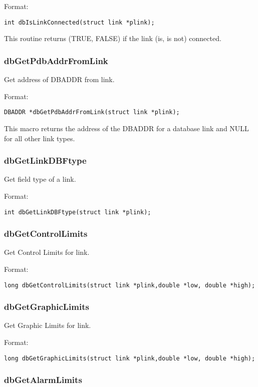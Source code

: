Format:

\begin{verbatim}int dbIsLinkConnected(struct link *plink);
\end{verbatim}This routine returns (TRUE, FALSE) if the link (is, is not) connected.

\subsubsection{dbGetPdbAddrFromLink}

Get address of DBADDR from link.

Format:

\begin{verbatim}DBADDR *dbGetPdbAddrFromLink(struct link *plink);
\end{verbatim}This macro returns the address of the DBADDR for a database link and NULL for all other link types.

\subsubsection{dbGetLinkDBFtype}

Get field type of a link.

Format:

\begin{verbatim}int dbGetLinkDBFtype(struct link *plink);
\end{verbatim}\subsubsection{dbGetControlLimits}

Get Control Limits for link.

Format:

\begin{verbatim}long dbGetControlLimits(struct link *plink,double *low, double *high);
\end{verbatim}\subsubsection{dbGetGraphicLimits}

Get Graphic Limits for link.

Format:

\begin{verbatim}long dbGetGraphicLimits(struct link *plink,double *low, double *high);
\end{verbatim}\subsubsection{dbGetAlarmLimits}

